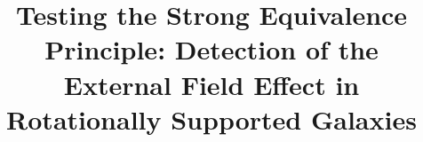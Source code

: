 \documentclass[twocolumn,tighten]{aastex63}
\begin{document}
\title{Testing the Strong Equivalence Principle: Detection of the External Field Effect in Rotationally Supported Galaxies}


\end{document}
